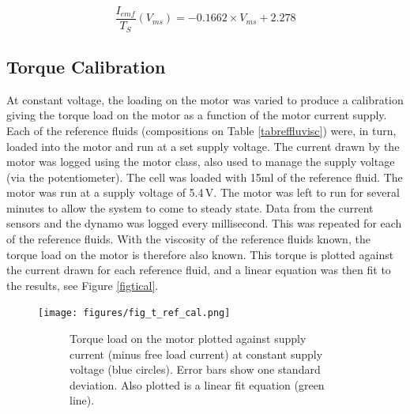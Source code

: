 \documentclass[twoside,a4]{report}
\def\br{\newline \newline \noindent}
\begin{document}
	\begin{equation}
		\frac{I_{emf}}{T_S} (V_{ms}) = -0.1662 \times V_{ms} + 2.278
		\label{eqnemftsend}
	\end{equation}
	
	\subsection*{Torque Calibration}
	At constant voltage, the loading on the motor was varied to produce a calibration giving the torque load on the motor as a function of the motor current supply. Each of the reference fluids (compositions on Table \ref{tabreffluvisc}) were, in turn, loaded into the motor and run at a set supply voltage. The current drawn by the motor was logged using the motor class, also used to manage the supply voltage (via the potentiometer).
	\br
	The cell was loaded with 15ml of the reference fluid. The motor was run at a supply voltage of 5.4\,V. The motor was left to run for several minutes to allow the system to come to steady state. Data from the current sensors and the dynamo was logged every millisecond. This was repeated for each of the reference fluids. With the viscosity of the reference fluids known, the torque load on the motor is therefore also known. This torque is plotted against the current drawn for each reference fluid, and a linear equation was then fit to the results, see Figure \ref{figtical}.
	\newline
	\begin{figure}[!htb]
		\centering
		\texttt{[image: figures/fig\_t\_ref\_cal.png]}
		\caption{Torque Calibration Results}
		\label{figtical}
		\begin{subfigure}{0.9\textwidth}
			\footnotesize Torque load on the motor plotted against supply current (minus free load current) at constant supply voltage (blue circles). Error bars show one standard deviation. Also plotted is a linear fit equation (green line).
		\end{subfigure}
	\end{figure}
	
\end{document}
